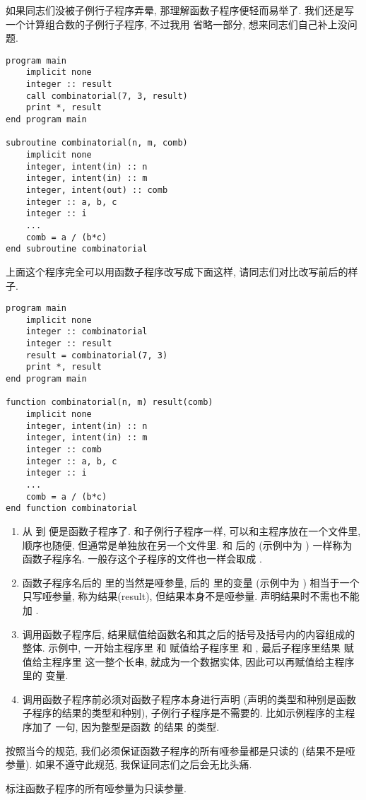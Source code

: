 如果同志们没被子例行子程序弄晕, 那理解函数子程序便轻而易举了. 我们还是写一个计算组合数的子例行子程序, 不过我用  省略一部分, 想来同志们自己补上没问题. 
\begin{lstlisting} 
program main
    implicit none
    integer :: result
    call combinatorial(7, 3, result)
    print *, result
end program main

subroutine combinatorial(n, m, comb)
    implicit none
    integer, intent(in) :: n
    integer, intent(in) :: m
    integer, intent(out) :: comb
    integer :: a, b, c
    integer :: i
    ... 
    comb = a / (b*c)
end subroutine combinatorial
\end{lstlisting} 
上面这个程序完全可以用函数子程序改写成下面这样, 请同志们对比改写前后的样子. 
\begin{lstlisting} 
program main
    implicit none
    integer :: combinatorial
    integer :: result
    result = combinatorial(7, 3)
    print *, result
end program main

function combinatorial(n, m) result(comb)
    implicit none
    integer, intent(in) :: n
    integer, intent(in) :: m
    integer :: comb
    integer :: a, b, c
    integer :: i
    ... 
    comb = a / (b*c)
end function combinatorial
\end{lstlisting} 
\begin{enumerate} 
    \item 从  到  便是函数子程序了. 和子例行子程序一样, 可以和主程序放在一个文件里, 顺序也随便, 但通常是单独放在另一个文件里.   和  后的  (示例中为 ) 一样称为函数子程序名. 一般存这个子程序的文件也一样会取成 . 
    \item 函数子程序名后的 \ttt{()} 里的当然是哑参量, \ttt{()} 后的  里的变量  (示例中为 ) 相当于一个只写哑参量, 称为结果(result), 但结果本身不是哑参量. 声明结果时不需也不能加 . 
    \item 调用函数子程序后, 结果赋值给函数名和其之后的括号及括号内的内容组成的整体. 示例中, 一开始主程序里  和  赋值给子程序里  和 , 最后子程序里结果  赋值给主程序里  这一整个长串,  就成为一个数据实体, 因此可以再赋值给主程序里的  变量. 
    \item 调用函数子程序前必须对函数子程序本身进行声明 (声明的类型和种别是函数子程序的结果的类型和种别), 子例行子程序是不需要的. 比如示例程序的主程序加了  一句, 因为整型是函数  的结果  的类型. 
\end{enumerate} 
按照当今的规范, 我们必须保证函数子程序的所有哑参量都是只读的 (结果不是哑参量). 如果不遵守此规范, 我保证同志们之后会无比头痛. 
\begin{convention}\label{func_all_in}
    标注函数子程序的所有哑参量为只读参量. 
\end{convention} 

